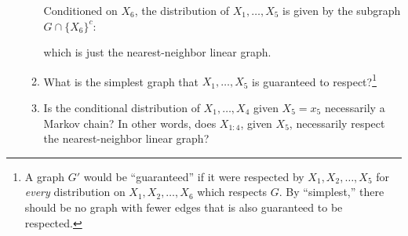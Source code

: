 \documentclass[11pt]{report}
\begin{document}
\begin{enumerate}[1.]
\begin{enumerate}
		            \begin{center}
		            \end{center}

		            Conditioned on $X_6$, the distribution of $X_1,\dotsc,X_5$ is given by the subgraph $G \cap \{X_6\}^c$:

		            \begin{center}
		            \end{center}
		            which is just the nearest-neighbor linear graph.

		            \color{black}

		      \item
		            What is the simplest graph that $X_1,\ldots,X_5$ is guaranteed to respect?\footnote{A graph $G'$ would be ``guaranteed'' if it were respected by $X_1,X_2,\ldots,X_5$ for {\em every} distribution on
			            $X_1,X_2,\ldots,X_6$ which respects $G$. By ``simplest,'' there should be no graph with fewer edges that is also guaranteed to be respected.}

		            \color{blue}
		            \begin{center}
		            \end{center}
		            \color{black}



		      \item Is the conditional distribution of $X_1,\dotsc,X_4$ given $X_5=x_5$ necessarily a Markov chain?
		            In other words, does $X_{1:4}$, given $X_5$, necessarily respect the
		            nearest-neighbor linear graph?


\end{enumerate}
\end{enumerate}
\end{document}
